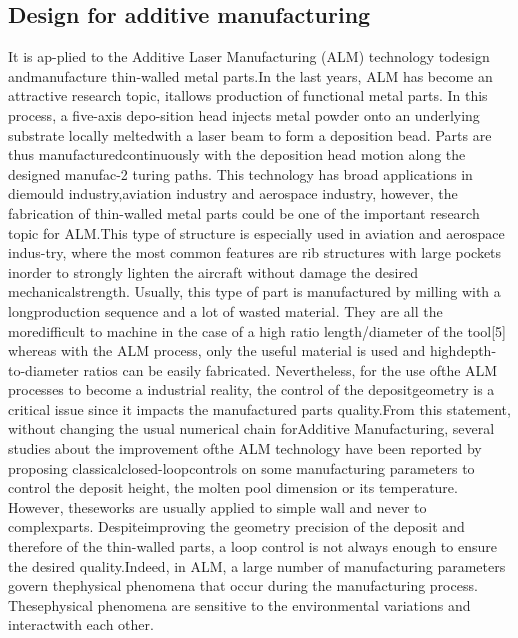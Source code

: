 \documentclass[conference]{IEEEtran}
\begin{document}
\subsection{Design for additive manufacturing}
It is ap-plied to the Additive Laser Manufacturing (ALM) technology todesign andmanufacture thin-walled metal parts.In the last years, ALM has become an attractive research topic, itallows production of functional metal parts. In this process, a five-axis depo-sition head injects metal powder onto an underlying substrate locally meltedwith a laser beam to form a deposition bead. Parts are thus manufacturedcontinuously with the deposition head motion along the designed manufac-2
turing paths. This technology has broad applications in diemould industry,aviation industry and aerospace industry, however, the fabrication of thin-walled metal parts could be one of the important research topic for ALM.This type of structure is especially used in aviation and aerospace indus-try, where the most common features are rib structures with large pockets inorder to strongly lighten the aircraft without damage the desired mechanicalstrength. Usually, this type of part is manufactured by milling with a longproduction sequence and a lot of wasted material. They are all the moredifficult to machine in the case of a high ratio length/diameter of the tool[5] whereas with the ALM process, only the useful material is used and highdepth-to-diameter ratios can be easily fabricated. Nevertheless, for the use ofthe ALM processes to become a industrial reality, the control of the depositgeometry is a critical issue since it impacts the manufactured parts quality.From this statement, without changing the usual numerical chain forAdditive Manufacturing, several studies about the improvement ofthe ALM technology have been reported by proposing classicalclosed-loopcontrols on some manufacturing parameters to control the deposit height, the molten pool dimension or its temperature. However, theseworks are usually applied to simple wall and never to complexparts. Despiteimproving the geometry precision of the deposit and therefore of the thin-walled parts, a loop control is not always enough to ensure the desired quality.Indeed, in ALM, a large number of manufacturing parameters govern thephysical phenomena that occur during the manufacturing process. Thesephysical phenomena are sensitive to the environmental variations and interactwith each other.  
\end{document}
